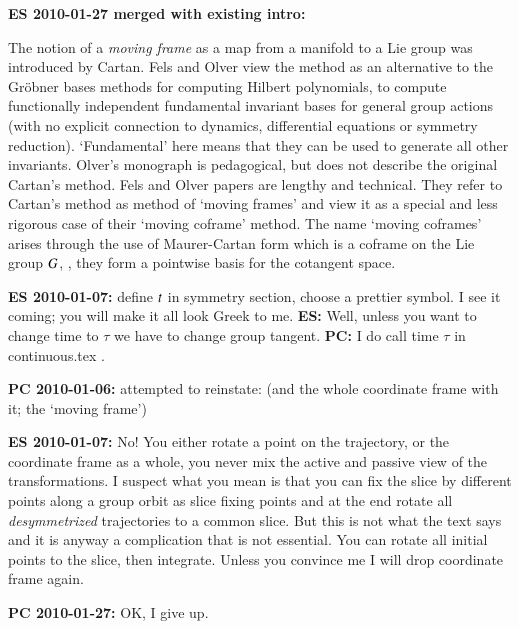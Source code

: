 {\bf ES 2010-01-27 merged with existing intro:}

The notion of a {\em moving frame} as a map from a manifold
to a Lie group was introduced by Cartan. Fels
and Olver view the method as an alternative to the Gr\"obner
bases methods for computing Hilbert polynomials, to compute
functionally independent fundamental invariant bases for
general group actions (with no explicit connection to
dynamics, differential equations or symmetry reduction).
`Fundamental' here means that they can be used to generate
all other invariants. Olver's monograph is
pedagogical, but does not describe the original Cartan's
method. Fels and Olver papers are
lengthy and technical. They refer to Cartan's method as
method of `moving frames' and view it as a special and less
rigorous case of their `moving coframe' method. The name
`moving coframes' arises through the use of Maurer-Cartan
form which is a coframe on the Lie group $G$, \ie, they
form a pointwise basis for the cotangent space.

{\bf ES 2010-01-07:}
define $t$ in symmetry section, choose a prettier
symbol. I see it coming; you will make it all look Greek to
me. {\bf ES:} Well, unless 	you want to change time to $\tau$
we have to change 	group tangent. {\bf PC:} I do call time
$\tau$ in continuous.tex .

{\bf PC 2010-01-06:} attempted to reinstate: (and the whole
coordinate frame with it; the `moving frame')

{\bf ES 2010-01-07:} No! You either rotate a point on the trajectory, or the coordinate
	frame as a whole, you never mix the active and passive view of the transformations.
	I suspect what you mean is that you can fix the slice by different points along
	a group orbit as slice fixing points and at the end rotate all \emph{desymmetrized} trajectories
	to a common slice. But this is not what the text says and it is anyway a complication
	that is not essential. You can rotate all initial points to the slice, then integrate.
	Unless you convince me I will drop coordinate frame again.

{\bf PC 2010-01-27:} OK, I give up.
